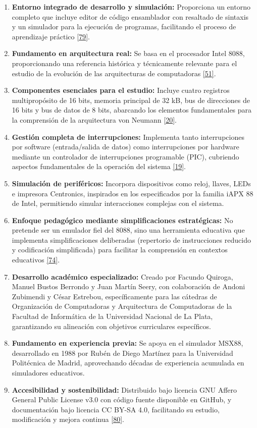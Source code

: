 \documentclass[12pt,oneside]{templates/unerthesis}
\begin{document}
\begin{enumerate}
\def\labelenumi{\arabic{enumi}.}
\item
  \textbf{Entorno integrado de desarrollo y simulación:} Proporciona un entorno completo que incluye editor de código ensamblador con resaltado de sintaxis y un simulador para la ejecución de programas, facilitando el proceso de aprendizaje práctico \protect\hyperlink{ref-vonsim}{{[}79{]}}.
\item
  \textbf{Fundamento en arquitectura real:} Se basa en el procesador Intel 8088, proporcionando una referencia histórica y técnicamente relevante para el estudio de la evolución de las arquitecturas de computadoras \protect\hyperlink{ref-intel8086manual}{{[}51{]}}.
\item
  \textbf{Componentes esenciales para el estudio:} Incluye cuatro registros multipropósito de 16 bits, memoria principal de 32 kB, bus de direcciones de 16 bits y bus de datos de 8 bits, abarcando los elementos fundamentales para la comprensión de la arquitectura von Neumann \protect\hyperlink{ref-stallings_computer_2021}{{[}20{]}}.
\item
  \textbf{Gestión completa de interrupciones:} Implementa tanto interrupciones por software (entrada/salida de datos) como interrupciones por hardware mediante un controlador de interrupciones programable (PIC), cubriendo aspectos fundamentales de la operación del sistema \protect\hyperlink{ref-hennessy2017computer}{{[}19{]}}.
\item
  \textbf{Simulación de periféricos:} Incorpora dispositivos como reloj, llaves, LEDs e impresora Centronics, inspirados en los especificados por la familia iAPX 88 de Intel, permitiendo simular interacciones complejas con el sistema.
\item
  \textbf{Enfoque pedagógico mediante simplificaciones estratégicas:} No pretende ser un emulador fiel del 8088, sino una herramienta educativa que implementa simplificaciones deliberadas (repertorio de instrucciones reducido y codificación simplificada) para facilitar la comprensión en contextos educativos \protect\hyperlink{ref-patt2019introduction}{{[}74{]}}.
\item
  \textbf{Desarrollo académico especializado:} Creado por Facundo Quiroga, Manuel Bustos Berrondo y Juan Martín Seery, con colaboración de Andoni Zubimendi y César Estrebou, específicamente para las cátedras de Organización de Computadoras y Arquitectura de Computadoras de la Facultad de Informática de la Universidad Nacional de La Plata, garantizando su alineación con objetivos curriculares específicos.
\item
  \textbf{Fundamento en experiencia previa:} Se apoya en el simulador MSX88, desarrollado en 1988 por Rubén de Diego Martínez para la Universidad Politécnica de Madrid, aprovechando décadas de experiencia acumulada en simuladores educativos.
\item
  \textbf{Accesibilidad y sostenibilidad:} Distribuido bajo licencia GNU Affero General Public License v3.0 con código fuente disponible en GitHub, y documentación bajo licencia CC BY-SA 4.0, facilitando su estudio, modificación y mejora continua \protect\hyperlink{ref-opensource_licensing_2024}{{[}80{]}}.
\end{enumerate}
\end{document}
